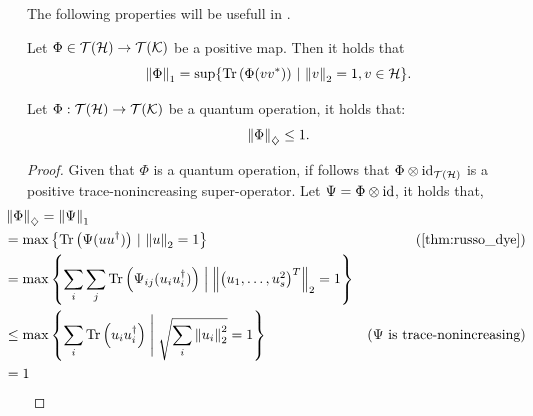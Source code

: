 The following properties will be usefull in .


\begin{theorem} \label{thm:russo_dye}
Let \(\Phi \in \mathcal{T}(\mathcal{H}) \to \mathcal{T}(\mathcal{K})\) be a positive map. Then it holds that
\[
\left\lVert \Phi \right\rVert_{1}= \sup \{ \operatorname{Tr} \left( \Phi(vv^*) \right) \, \vert \, \left\lVert v \right\rVert_{2}=1, v\in \mathcal{H}  \}.
\]
\end{theorem}

\begin{corollary} \label{cor:gen_diamond_cptp_norm}
   Let  $\Phi:  \mathcal{T}(\mathcal{H}) \to \mathcal{T}(\mathcal{K})$ be a quantum operation, it holds that:
    \begin{equation*}
      \left\lVert \Phi \right\rVert_{\diamondsuit} \leq 1.
    \end{equation*}
  \end{corollary}
 

  \begin{proof}
    Given that $\Phi$ is a  quantum operation, if follows that $ \Phi \otimes  \mathrm{id}_{\mathcal{T}(\mathcal{H})}$ is a positive trace-nonincreasing super-operator. Let $\Psi = \Phi \otimes \mathrm{id}$, it holds that,
    \begin{align*}
      & \hspace{-20pt} \diamondnorm{\Phi} =\tracenorm{\Psi}\\
      &  \hspace{-20pt} = \max \left\{\tr \left( \Psi (u u^\dag)\right) \, \vert \, \euclideannorm{u}=1 \right\}  & \left(\text{\autoref{thm:russo_dye}}\right)\\
      & \hspace{-20pt} = \max \left\{ \sum_i \sum_j \tr \left( \Psi_{ij} (u_i u_i^\dag)\right) \Bigm|  \euclideannorm{\begin{pmatrix} u_1, \ldots, u_s^2 \end{pmatrix}^T}=1 \right\} \\
      &  \hspace{-20pt} \leq \max \left\{ \sum_i \tr \left( u_i u_i^\dag \right) \Biggm| \sqrt{\sum_i \euclideannorm{u_i}^2}=1 \right\}   & (\Psi \text{ is trace-nonincreasing}) \\
      &  \hspace{-20pt} = 1
    \end{align*}
  \end{proof}



